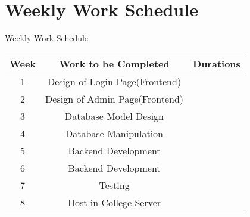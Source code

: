 \documentclass[default]{beamer}
\begin{document}
	\section{Weekly Work Schedule}
		\begin{frame}{Weekly Work Schedule}

		\begin{center}
		\begin{tabular}{|c|c|c|}
		\hline
		\textbf{Week} & \textbf{Work to be Completed} & \textbf{Durations}\\
		\hline
		1 & Design of Login Page(Frontend) &\\
		\hline
		2 & Design of Admin Page(Frontend) &\\
		\hline
		3 & Database Model Design &\\
		\hline
		4 & Database Manipulation &\\
		\hline
		5 & Backend Development &\\
		\hline
		6 & Backend Development &\\		
		\hline
		7 & Testing &\\
		\hline
		8 & Host in College Server &\\
		\hline
		\end{tabular}				
		\end{center}				
		\end{frame}			
\end{document}
